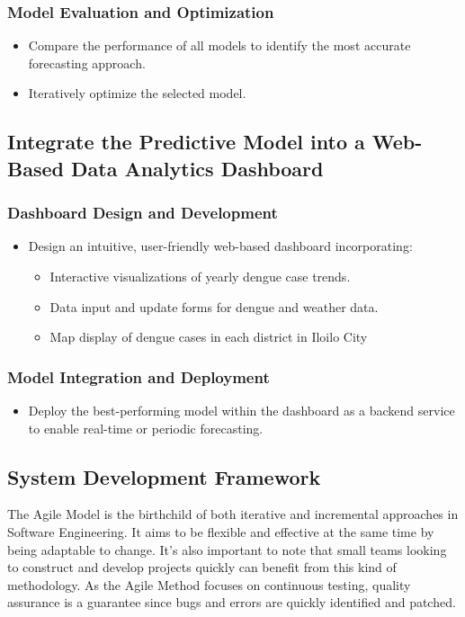 \subsubsection{Model Evaluation and Optimization}
\begin{itemize}
	\item Compare the performance of all models to identify the most accurate forecasting approach.
	\item Iteratively optimize the selected model.
\end{itemize}

\subsection{Integrate the Predictive Model into a Web-Based Data Analytics Dashboard}

\subsubsection{Dashboard Design and Development}
\begin{itemize}
	\item Design an intuitive, user-friendly web-based dashboard incorporating:
	\begin{itemize}
		\item Interactive visualizations of yearly dengue case trends.
		\item Data input and update forms for dengue and weather data.
		\item Map display of dengue cases in each district in Iloilo City
	\end{itemize}
\end{itemize}

\subsubsection{Model Integration and Deployment}
\begin{itemize}
	\item Deploy the best-performing model within the dashboard as a backend service to enable real-time or periodic forecasting.
\end{itemize}


\subsection{System Development Framework}
The Agile Model is the birthchild of both iterative and incremental approaches in Software Engineering. It aims to be flexible and effective at the same time by being adaptable to change. It's also important to note that small teams looking to construct and develop projects quickly can benefit from this kind of methodology. As the Agile Method focuses on continuous testing, quality assurance is a guarantee since bugs and errors are quickly identified and patched. 

